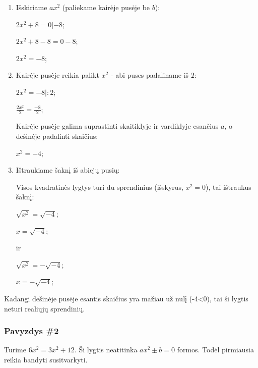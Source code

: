 \documentclass[a4paper]{article}
\begin{document}
\begin{enumerate}
      \item  Išskiriame $ ax^{2} $ (paliekame kairėje pusėje be $ b $):

            $ 2x^{2}+8=0 | -8 $;

            $ 2x^{2}+8-8=0-8 $;

            $ 2x^{2}=-8 $;

      \item Kairėje pusėje reikia palikt $ x^2 $ - abi puses padaliname iš $ 2
            $:

            $ 2x^{2}=-8 |:2 $;

            $ \frac{2x^{2}}{2}=\frac{-8}{2}$;

            Kairėje pusėje galima suprastinti skaitiklyje ir vardiklyje
            esančius
            $ a $, o dešinėje padalinti skaičius:

            $ x^{2}=-4$;

      \item Ištraukiame šaknį iš abiejų pusių:

            Visos kvadratinės lygtys turi du sprendinius (išskyrus, $ x^2=0 $),
            tai ištraukus šaknį:

            $ \sqrt{x^{2}}=\sqrt{-4}$;

            $ x=\sqrt{-4}$;

            ir

            $ \sqrt{x^{2}}=-\sqrt{-4}$;

            $ x=-\sqrt{-4}$;

\end{enumerate}

Kadangi dešinėje pusėje esantis skaičius yra mažiau už nulį (-4<0), tai ši
lygtis neturi realiųjų sprendinių.

\subsubsection{Pavyzdys \#2}

Turime $ 6x^{2}=3x^{2}+12 $. Ši lygtis neatitinka $ ax^{2}\pm b=0 $ formos.
Todėl pirmiausia reikia bandyti susitvarkyti.
\end{document}
